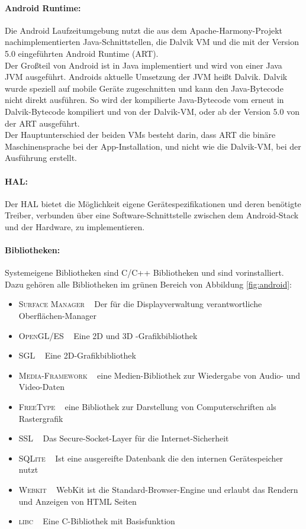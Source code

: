 \paragraph{Android Runtime: }
Die Android Laufzeitumgebung nutzt die aus dem Apache-Harmony-Projekt nachimplementierten Java-Schnittstellen, die Dalvik \gls{VM} und die mit der Version 5.0 eingeführten Android Runtime (ART). \cite{android_5}\\
Der Großteil von Android ist in Java implementiert und wird von einer Java \gls{JVM} ausgeführt. Androids aktuelle Umsetzung der \gls{JVM} heißt Dalvik. Dalvik wurde speziell auf mobile Geräte zugeschnitten und kann den Java-Bytecode nicht direkt ausführen. So wird der kompilierte Java-Bytecode vom erneut in Dalvik-Bytecode kompiliert und von der Dalvik-\gls{VM}, oder ab der Version 5.0 von der ART ausgeführt.\\
Der Hauptunterschied der beiden \glspl{VM} besteht darin, dass ART die binäre Maschinensprache bei der \gls{App}-Installation, und nicht wie die Dalvik-\gls{VM}, bei der Ausführung erstellt.
\paragraph{\gls{HAL}: }
Der \gls{HAL} bietet die Möglichkeit eigene Gerätespezifikationen und deren benötigte Treiber, verbunden über eine Software-Schnittstelle zwischen dem Android-Stack und der Hardware, zu implementieren. \cite{android_hal}
\paragraph{Bibliotheken: }
Systemeigene Bibliotheken sind C/C++ Bibliotheken und sind vorinstalliert. Dazu gehören alle Bibliotheken im grünen Bereich von Abbildung \ref{fig:android}:
\begin{itemize}[leftmargin=0.7cm]
\renewcommand\labelitemi{--}
	\item \textsc{Surface Manager} ~ Der für die Displayverwaltung verantwortliche Oberflächen-Manager
	\item \textsc{OpenGL/ES} ~ Eine 2D und 3D -Grafikbibliothek
	\item \textsc{SGL} ~ Eine 2D-Grafikbibliothek
 	\item \textsc{Media-Framework} ~ eine Medien-Bibliothek zur Wiedergabe von Audio- und Video-Daten 	
 	\item \textsc{FreeType} ~ eine Bibliothek zur Darstellung von Computerschriften als Rastergrafik
 	\item \textsc{SSL} ~ Das Secure-Socket-Layer für die Internet-Sicherheit
	\item \textsc{SQLite} ~ Ist eine ausgereifte Datenbank die den internen Gerätespeicher nutzt 
	\item \textsc{Webkit} ~ WebKit ist die Standard-Browser-Engine und erlaubt das Rendern und Anzeigen von HTML Seiten
	\item \textsc{libc} ~ Eine C-Bibliothek mit Basisfunktion
\end{itemize}
